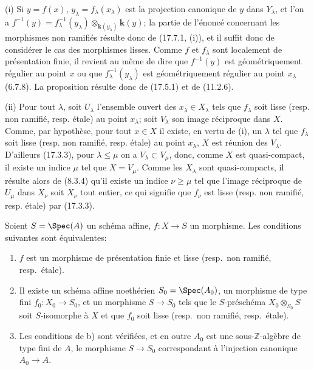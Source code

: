 (i) Si $y=f(x)$, $y_\lambda=f_\lambda(x_\lambda)$ est la projection canonique de $y$ dans $Y_\lambda$, et l'on a $f^{-1}(y)=f_\lambda^{-1}(y_\lambda)\otimes_{\mathbf{k}(y_\lambda)}\boldsymbol{k}(y)$; la partie de l'énoncé concernant les morphismes non ramifiés résulte donc de (17.7.1, (i)), et il suffit donc de considérer le cas des morphismes lisses. Comme $f$ et $f_\lambda$ sont localement de présentation finie, il revient au même de dire que $f^{-1}(y)$ est géométriquement régulier au point $x$ ou que $f_\lambda^{-1}(y_\lambda)$ est géométriquement régulier au point $x_\lambda$ (6.7.8). La proposition résulte donc de (17.5.1) et de (11.2.6).

(ii) Pour tout $\lambda$, soit $U_\lambda$ l'ensemble ouvert des $x_\lambda\in X_\lambda$ tels que $f_\lambda$ soit lisse (resp. non ramifié, resp. étale) au point $x_\lambda$; soit $V_\lambda$ son image réciproque dans $X$. Comme, par hypothèse, pour tout $x\in X$ il existe, en vertu de (i), un $\lambda$ tel que $f_\lambda$ soit lisse (resp. non ramifié, resp. étale) au point $x_\lambda$, $X$ est réunion des $V_\lambda$. D'ailleurs (17.3.3), pour $\lambda\leq\mu$ on a $V_\lambda\subset V_\mu$, donc, comme $X$ est quasi-compact, il existe un indice $\mu$ tel que $X=V_\mu$. Comme les $X_\lambda$ sont quasi-compacts, il résulte alors de (8.3.4) qu'il existe un indice $\nu\geq\mu$ tel que l'image réciproque de $U_\mu$ dans $X_\nu$ soit $X_\nu$ tout entier, ce qui signifie que $f_\nu$ est lisse (resp. non ramifié, resp. étale) par (17.3.3).

\begin{corollary}[17.7.9]
\label{IV.17.7.9}
Soient $S=\Spec(A)$ un schéma affine, $f:X\to S$ un morphisme. Les conditions suivantes sont équivalentes:
\begin{enumerate}
  \item[\textup{a)}] $f$ est un morphisme de présentation finie et lisse \textup{(resp.}\ non ramifié, \textup{resp.}\ étale\textup{)}.


  \item[\textup{b)}] Il existe un schéma affine noethérien $S_0=\Spec(A_0)$, un morphisme de type fini $f_0:X_0\to S_0$, et un morphisme $S\to S_0$ tels que le $S$-préschéma $X_0\otimes_{S_0}S$ soit $S$-isomorphe à $X$ et que $f_0$ soit lisse \textup{(resp.}\ non ramifié, \textup{resp.}\ étale\textup{)}.
  \item[\textup{c)}] Les conditions de \textup{b)} sont vérifiées, et en outre $A_0$ est une sous-$\mathbb{Z}$-algèbre de type fini de $A$, le morphisme $S\to S_0$ correspondant à l'injection canonique $A_0\to A$.
\end{enumerate}
\end{corollary}

